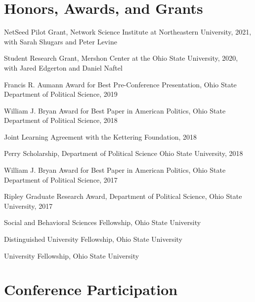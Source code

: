 \documentclass[letterpaper]{article}
\renewenvironment{itemize}{
  \begin{list}{}{
    \setlength{\leftmargin}{1.5em}
  }
}{
  \end{list}
}
\begin{document}
\section*{Honors, Awards, and Grants}

\begin{itemize}

\item NetSeed Pilot Grant, Network Science Institute at Northeastern University, 2021, with Sarah Shugars and Peter Levine

\item Student Research Grant, Mershon Center at the Ohio State University, 2020, with Jared Edgerton and Daniel Naftel

\item Francis R. Aumann Award for Best Pre-Conference Presentation, Ohio State Department of Political Science, 2019

\item William J. Bryan Award for Best Paper in American Politics, Ohio State Department of Political Science, 2018

\item Joint Learning Agreement with the Kettering Foundation, 2018

\item Perry Scholarship, Department of Political Science Ohio State University, 2018

\item William J. Bryan Award for Best Paper in American Politics, Ohio State Department of Political Science, 2017

\item Ripley Graduate Research Award, Department of Political Science, Ohio State University, 2017

\item Social and Behavioral Sciences Fellowship, Ohio State University

\item Distinguished University Fellowship, Ohio State University

\item University Fellowship, Ohio State University
\end{itemize}

\section*{Conference Participation}
\end{document}

